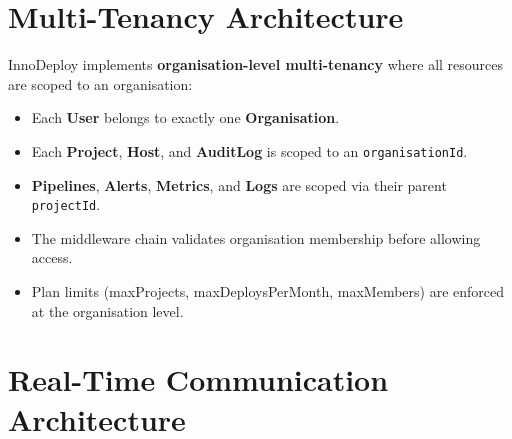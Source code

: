 \documentclass[12pt,a4paper,twoside]{report}
\begin{document}
\section{Multi-Tenancy Architecture}

InnoDeploy implements \textbf{organisation-level multi-tenancy} where all resources are scoped to an organisation:

\begin{itemize}[noitemsep]
  \item Each \textbf{User} belongs to exactly one \textbf{Organisation}.
  \item Each \textbf{Project}, \textbf{Host}, and \textbf{AuditLog} is scoped to an \texttt{organisationId}.
  \item \textbf{Pipelines}, \textbf{Alerts}, \textbf{Metrics}, and \textbf{Logs} are scoped via their parent \texttt{projectId}.
  \item The middleware chain validates organisation membership before allowing access.
  \item Plan limits (maxProjects, maxDeploysPerMonth, maxMembers) are enforced at the organisation level.
\end{itemize}

\section{Real-Time Communication Architecture}
\end{document}
